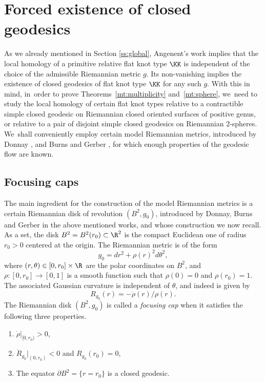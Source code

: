 \section{Forced existence of closed geodesics}
\label{s:forcing}

As we already mentioned in Section \ref{ss:global}, Angenent's work \cite{Angenent:2005aa} implies that the local homology of a primitive relative flat knot type $\KK$ is independent of the choice of the admissible Riemannian metric $g$.
Its non-vanishing implies the existence of closed geodesics of flat knot type $\KK$ for any such $g$. With this in mind, in~order to prove Theorems~\ref{mt:multiplicity} and~\ref{mt:sphere}, we~need to study the local homology of certain flat knot types relative to a contractible simple closed geodesic on Riemannian closed oriented surfaces of positive genus, or relative to a pair of disjoint simple closed geodesics on Riemannian $2$-spheres. We~shall conveniently employ certain model Riemannian metrics, introduced by Donnay \cite{Donnay:1988ab}, and Burns and Gerber \cite{Burns:1989aa}, for which enough properties of the geodesic flow are known.

\subsection{Focusing caps}
The main ingredient for the construction of the model Riemannian metrics is a certain Riemannian disk of revolution $(B^2,g_0)$, introduced by Donnay, Burns and Gerber in the above mentioned works, and whose construction we now recall.
As a set, the disk $B^2=B^2(r_0)\subset\R^2$ is the compact Euclidean one of radius $r_0>0$ centered at the origin. The Riemannian metric is of the form
\[
g_0 = dr^2+\rho(r)^2d\theta^2,
\]
where $(r,\theta)\in[0,r_0]\times\R$ are the polar coordinates on $B^2$, and $\rho:[0,r_0]\to[0,1]$ is a smooth function such that $\rho(0)=0$ and $\rho(r_0)=1$. The associated Gaussian curvature is independent of $\theta$, and indeed is given by
\[
R_{g_0}(r)=-\ddot\rho(r)/\rho(r).
\]
The Riemannian disk $(B^2,g_0)$ is called a \emph{focusing cap} when it satisfies the following three properties.
\begin{enumerate}
\item
$\dot\rho|_{[0,r_0)}>0$,

\item
$\dot R_{g_0}|_{(0,r_0)}<0$ and $R_{g_0}(r_0)=0$,

\item
The equator $\partial B^2=\{r=r_0\}$ is a closed geodesic.
\end{enumerate}


